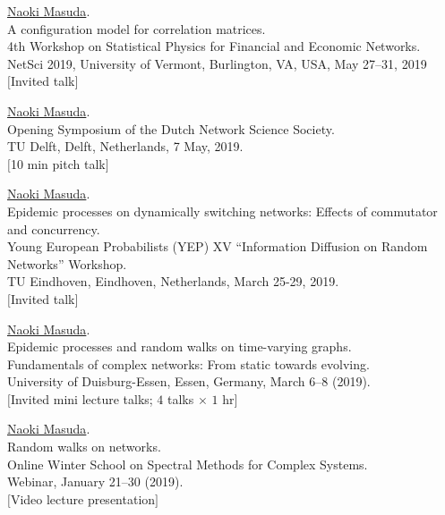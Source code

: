 \documentclass[11pt,letter]{article}
\begin{document}
\begin{etaremune}
\item \underline{Naoki Masuda}.\\
A configuration model for correlation matrices.\\
4th Workshop on Statistical Physics for Financial and Economic Networks.\\
NetSci 2019, University of Vermont, Burlington, VA, USA, May 27--31, 2019\\
$[$Invited talk$]$

\item \underline{Naoki Masuda}.\\
Opening Symposium of the Dutch Network Science Society.\\
TU Delft, Delft, Netherlands, 7 May, 2019.\\
$[$10 min pitch talk$]$

\item \underline{Naoki Masuda}.\\
Epidemic processes on dynamically switching networks: Effects of commutator and concurrency.\\
Young European Probabilists (YEP) XV ``Information Diffusion on Random Networks'' Workshop.\\
TU Eindhoven, Eindhoven, Netherlands, March 25-29, 2019.\\
$[$Invited talk$]$

\item \underline{Naoki Masuda}.\\
Epidemic processes and random walks on time-varying graphs.\\
Fundamentals of complex networks: From static towards evolving.\\
University of Duisburg-Essen, Essen, Germany, March 6--8 (2019).\\
$[$Invited mini lecture talks; $4$ talks $\times$ $1$ hr$]$

\item \underline{Naoki Masuda}.\\
Random walks on networks.\\
Online Winter School on Spectral Methods for Complex Systems.\\
Webinar, January 21--30 (2019).\\
$[$Video lecture presentation$]$


\end{etaremune}
\end{document}
